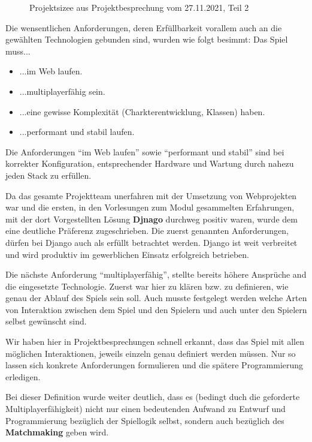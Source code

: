 \begin{figure}[H]
    \centering
    \caption{Projektsizee aus Projektbesprechung vom 27.11.2021, Teil 2}
    \label{fig:2021-11-27-projektskizze-2}
\end{figure}

Die wensentlichen Anforderungen, deren Erfüllbarkeit vorallem auch an die gewählten Technologien gebunden sind, wurden wie folgt besimmt: Das Spiel muss... \begin{itemize}
    \item ...im Web laufen.
    \item ...multiplayerfähig sein.
    \item ...eine gewisse Komplexität (Charkterentwicklung, Klassen) haben.
    \item ...performant und stabil laufen.
\end{itemize}

Die Anforderungen \enquote{im Web laufen} sowie \enquote{performant und stabil} sind bei korrekter Konfiguration, entsprechender Hardware und Wartung durch nahezu jeden \ac{Stack} zu erfüllen. 

Da das gesamte Projektteam unerfahren mit der Umsetzung von Webprojekten war und die ersten, in den Vorlesungen zum Modul gesammelten Erfahrungen, mit der dort Vorgestellten Lösung \textbf{Djnago} durchweg positiv waren, wurde dem eine deutliche Präferenz zugeschrieben. Die zuerst genannten Anforderungen, dürfen bei Django auch als erfüllt betrachtet werden. Django ist weit verbreitet und wird produktiv im gewerblichen Einsatz erfolgreich betrieben. 

Die nächste Anforderung \enquote{multiplayerfähig}, stellte bereits höhere Ansprüche and die eingesetzte Technologie. Zuerst war hier zu klären bzw. zu definieren, wie genau der Ablauf des Spiels sein soll. Auch musste festgelegt werden welche Arten von Interaktion zwischen dem Spiel und den Spielern und auch unter den Spielern selbst gewünscht sind. 

Wir haben hier in Projektbesprechungen schnell erkannt, dass das Spiel mit allen möglichen Interaktionen, jeweils einzeln genau definiert werden müssen. Nur so lassen sich konkrete Anforderungen formulieren und die spätere Programmierung erledigen. 

Bei dieser Definition wurde weiter deutlich, dass es (bedingt duch die geforderte Multiplayerfähigkeit) nicht nur einen bedeutenden Aufwand zu Entwurf und Programmierung bezüglich der Spiellogik selbst, sondern auch bezüglich des \textbf{\gls{Matchmaking}} geben wird. 

